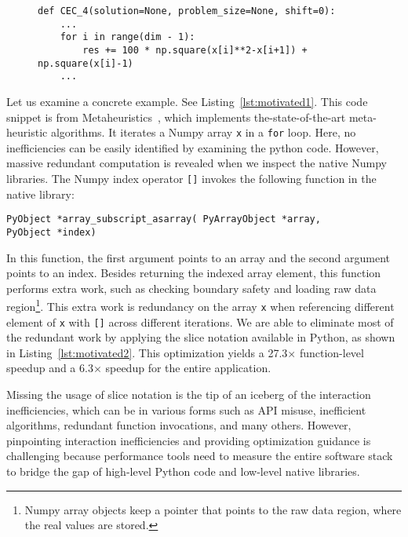 
\begin{figure}[t]
\begin{lstlisting}[caption={Code snippet from Metaheuritics~\cite{nguyen2019building, nguyen2018resource}. Interaction inefficiencies exist in referencing Numpy arrays.},label=lst:motivated1]
def CEC_4(solution=None, problem_size=None, shift=0):
    ...
    for i in range(dim - 1):
        res += 100 * np.square(x[i]**2-x[i+1]) + np.square(x[i]-1)
    ...
\end{lstlisting}
\end{figure}

Let us examine a concrete example. See 
Listing~\ref{lst:motivated1}. This code snippet is from Metaheuristics~\cite{nguyen2019building, nguyen2018resource}, which implements the-state-of-the-art meta-heuristic algorithms.
It iterates a Numpy array {\tt x} in a {\tt for} loop. Here, no inefficiencies can be easily identified by examining the python code. However, massive redundant computation is revealed when we inspect the native Numpy libraries.
The Numpy index operator {\tt []} invokes the following function in the native library:

{\tt PyObject *array\_subscript\_asarray(
\tab \tab \tab PyArrayObject *array, \\
\tab \tab \tab PyObject *index)}

In this function, the first argument points to an array and the second argument points to an index. 
Besides returning the indexed array element, this function performs extra work, such as checking boundary safety and loading raw data region\footnote{Numpy array objects keep a pointer that points to the raw data region, where the real values are stored.}. This extra work is redundancy on the array {\tt x} when referencing different element of {\tt x} with {\tt []} across different iterations. We are able to eliminate most of the redundant work by applying the slice notation available in Python, as shown in Listing~\ref{lst:motivated2}. This optimization yields a 27.3$\times$ function-level speedup and a 6.3$\times$ speedup for the entire application.

Missing the usage of slice notation is the tip of an iceberg of the interaction inefficiencies, which can be in various forms such as API misuse, inefficient algorithms, redundant function invocations, and many others.  However, pinpointing interaction inefficiencies and providing optimization guidance is challenging because performance tools need to measure the entire software stack to bridge the gap of high-level Python code and low-level native libraries. %


